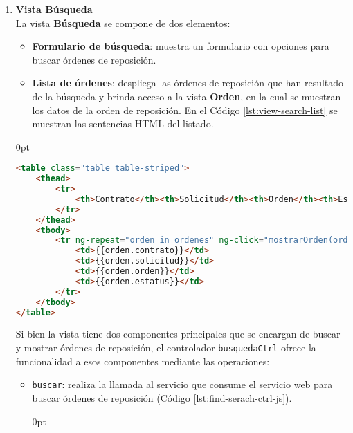 \begin{enumerate}
\begin{adjustwidth}{\listingfixwidth}{0pt}
\begin{lstlisting}[language=Javascript, caption={Servicio para actualizar un catálogo en \textit{AngularJS}.}, captionpos=b, label={lst:catalogo-service-js}]
	this.updateCatalog = function(file, catalog){
		var fd = new FormData();
		fd.append('file', file);
		$http.post('_data_/catalog/load/' + catalog, fd, {
			transformRequest: angular.identity,
			headers: {'Content-Type': undefined}
		});
    };	
});
\end{lstlisting}
\end{adjustwidth}
\item \textbf{Vista Búsqueda\\}
La vista \textbf{Búsqueda} se compone de dos elementos:
\begin{itemize}
	\item \textbf{Formulario de búsqueda}: muestra un formulario con opciones para buscar órdenes de reposición.
	\item \textbf{Lista de órdenes}: despliega las órdenes de reposición que han resultado de la búsqueda y brinda acceso a la vista \textbf{Orden}, en la cual se muestran los datos de la orden de reposición. En el Código \ref{lst:view-search-list} se muestran las sentencias HTML del listado.
\end{itemize}
\begin{adjustwidth}{\listingfixwidth}{0pt}
\begin{lstlisting}[language=HTML, captionpos=b, caption={Plantilla que muestra el resultado de la búsqueda de órdenes de reposición.}, label={lst:view-search-list}]
<table class="table table-striped">
	<thead>
		<tr>
			<th>Contrato</th><th>Solicitud</th><th>Orden</th><th>Estatus</th>
		</tr>
	</thead>
	<tbody>
		<tr ng-repeat="orden in ordenes" ng-click="mostrarOrden(orden.id, $event)">
			<td>{{orden.contrato}}</td>
			<td>{{orden.solicitud}}</td>
			<td>{{orden.orden}}</td>
			<td>{{orden.estatus}}</td>
		</tr>
	</tbody>
</table>
\end{lstlisting}
\end{adjustwidth}
Si bien la vista tiene dos componentes principales que se encargan de buscar y mostrar órdenes de reposición, el controlador \texttt{busquedaCtrl} ofrece la funcionalidad a esos componentes mediante las operaciones:
\begin{itemize}
	\item \texttt{buscar}: realiza la llamada al servicio que consume el servicio web para buscar órdenes de reposición (Código \ref{lst:find-serach-ctrl-js}).
\pagebreak
\begin{adjustwidth}{\listingfixlargewidth}{0pt}
\begin{lstlisting}[language=Javascript, caption={Función para llamar el servicio de búsqueda de órdenes de reposición.}, captionpos=b, label={lst:find-serach-ctrl-js}]

\end{lstlisting}
\end{adjustwidth}
\end{itemize}
\end{enumerate}

